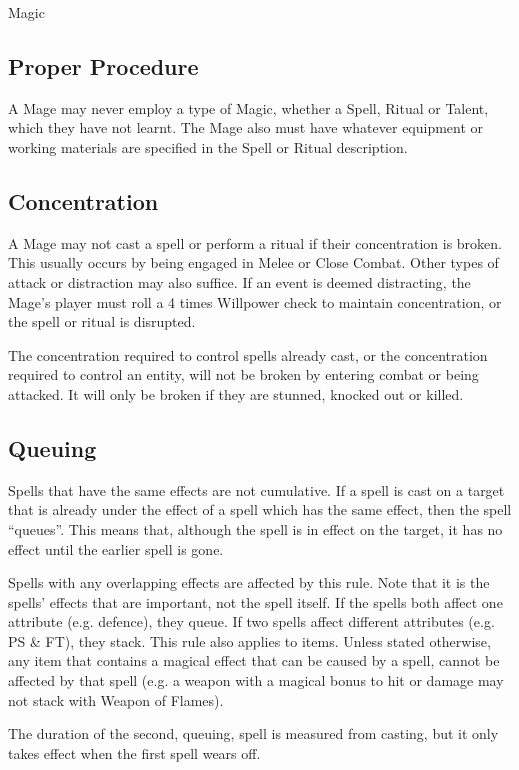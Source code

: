 \begin{Chapter}{Magic}
\subsection{Proper Procedure}

A Mage may never employ a type of Magic, whether a Spell, Ritual or
Talent, which they have not learnt.  The Mage also must have whatever
equipment or working materials are specified in the Spell or Ritual
description.

\subsection{Concentration}

A Mage may not cast a spell or perform a ritual if their concentration
is broken.  This usually occurs by being engaged in Melee or Close
Combat.  Other types of attack or distraction may also suffice. If an
event is deemed distracting, the Mage’s player must roll a 4 times
Willpower check to maintain concentration, or the spell or ritual is
disrupted.

The concentration required to control spells already cast, or the
concentration required to control an entity, will not be broken by
entering combat or being attacked.  It will only be broken if they are
stunned, knocked out or killed.

\subsection{Queuing}

Spells that have the same effects are not cumulative.  If a spell is
cast on a target that is already under the effect of a spell which has
the same effect, then the spell “queues”.  This means that, although
the spell is in effect on the target, it has no effect until the
earlier spell is gone.

Spells with any overlapping effects are affected by this rule.  Note
that it is the spells’ effects that are important, not the spell
itself.  If the spells both affect one attribute (e.g.  defence), they
queue.  If two spells affect different attributes (e.g. PS \& FT),
they stack.  This rule also applies to items.  Unless stated
otherwise, any item that contains a magical effect that can be caused
by a spell, cannot be affected by that spell (e.g. a weapon with a
magical bonus to hit or damage may not stack with Weapon of Flames).

The duration of the second, queuing, spell is measured from casting,
but it only takes effect when the first spell wears off.



\end{Chapter}

